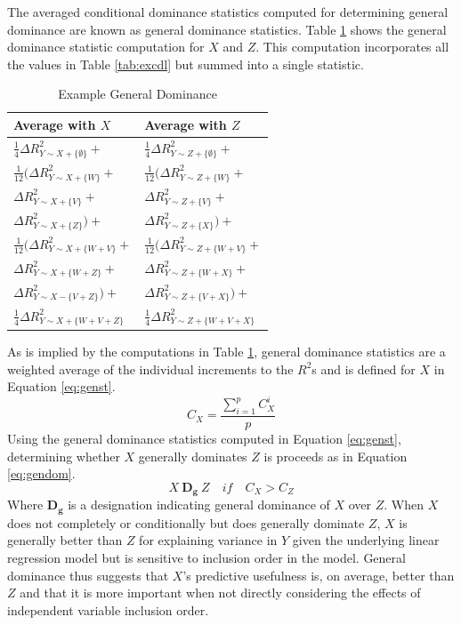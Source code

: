\documentclass[man]{apa7}
\begin{document}
	The averaged conditional dominance statistics computed for determining general dominance are known as general dominance statistics. 
	Table \ref{tab:exgen} shows the general dominance statistic computation for $X$ and $Z$.
	This computation incorporates all the values in Table \ref{tab:excdl} but summed into a single statistic.
	
		\begin{table}[h!]
		\centering
		\caption{\centering Example General Dominance}
		\begin{tabular}{ l l }
			Average with $X$ & Average with $Z$ \\
			\hline
			$\frac{1}{4}\Delta R^2_{Y \sim X + \{\emptyset\}} + $ & $\frac{1}{4} \Delta R^2_{Y \sim Z + \{\emptyset\}} +$ \\
			$\frac{1}{12} (\Delta R^2_{Y \sim X + \{W\}} + $ & $\frac{1}{12} (\Delta R^2_{Y \sim Z + \{W\}} + $ \\
			$\Delta R^2_{Y \sim X + \{V\}} + $ & $\Delta R^2_{Y \sim Z + \{V\}} + $ \\
			$\Delta R^2_{Y \sim X + \{Z\}}) + $ & $\Delta R^2_{Y \sim Z + \{X\}}) + $ \\
			$\frac{1}{12} (\Delta R^2_{Y \sim X + \{W + V\}} + $ & $\frac{1}{12} (\Delta R^2_{Y \sim Z + \{W + V\}} + $ \\
			$\Delta R^2_{Y \sim X + \{W + Z\}} + $ & $\Delta R^2_{Y \sim Z + \{W + X\}} + $ \\
			$\Delta R^2_{Y \sim X - \{V + Z\}}) + $ & $\Delta R^2_{Y \sim Z + \{V + X\}}) +$ \\
			$\frac{1}{4} \Delta R^2_{Y \sim X + \{W + V + Z\}}$ & $\frac{1}{4} \Delta R^2_{Y \sim Z + \{W + V + X\}}$ \\
			\hline
		\end{tabular}
		\label{tab:exgen}
	\end{table}

	As is implied by the computations in Table \ref{tab:exgen}, general dominance statistics are a weighted average of the individual increments to the $R^2$s and is defined for $X$ in Equation \ref{eq:genst}.
	\begin{equation}
		C_{X} = \frac{\sum^{p}_{i=1} C^i_{X}}{p}
		\label{eq:genst}
	\end{equation}
	Using the general dominance statistics computed in Equation \ref{eq:genst}, determining whether $X$ generally dominates $Z$ is proceeds as in Equation \ref{eq:gendom}.
	\begin{equation}
		X \ \mathbf{D_g} \ Z \quad if \quad C_{X} > C_{Z}
		\label{eq:gendom}
	\end{equation}
	Where $\mathbf{D_g}$ is a designation indicating general dominance of $X$ over $Z$.	
	When $X$ does not completely or conditionally but does generally dominate $Z$, $X$ is generally better than $Z$ for explaining variance in $Y$ given the underlying linear regression model but is sensitive to inclusion order in the model.
	General dominance thus suggests that $X$'s predictive usefulness is, on average, better than $Z$ and that it is more important when not directly considering the effects of independent variable inclusion order.
	
\end{document}
